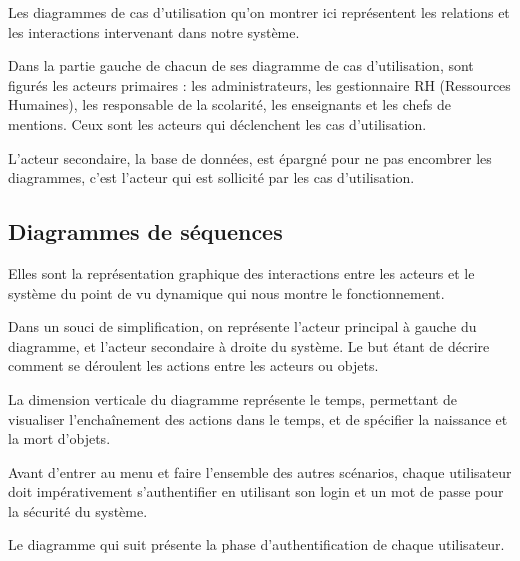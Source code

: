 Les diagrammes de cas d'utilisation qu'on montrer ici représentent les relations et les interactions intervenant dans notre système.
\medskip

Dans la partie gauche de chacun de ses diagramme de cas d'utilisation, sont figurés les acteurs primaires : les administrateurs, les gestionnaire RH (Ressources Humaines), les responsable de la scolarité, les enseignants et les chefs de mentions. Ceux sont les acteurs qui déclenchent les cas d'utilisation. 
\medskip

L'acteur secondaire, la base de données, est épargné pour ne pas encombrer les diagrammes, c'est l'acteur qui est sollicité par les cas d'utilisation.




\clearpage

\subsection{Diagrammes de séquences}
Elles sont la représentation graphique des interactions entre les acteurs et le système du point de vu dynamique qui nous montre le fonctionnement.
\medskip

Dans un souci de simplification, on représente l'acteur principal à gauche du diagramme, et l'acteur secondaire à droite du système. Le but étant de décrire comment se déroulent les actions entre les acteurs ou objets.
\medskip

La dimension verticale du diagramme représente le temps, permettant de visualiser l'enchaînement des actions dans le temps, et de spécifier la naissance et la mort d'objets.
\medskip

Avant d'entrer au menu et faire l'ensemble des autres scénarios, chaque utilisateur doit impérativement s'authentifier en utilisant son login et un mot de passe pour la sécurité du système.
\medskip

Le diagramme qui suit présente la phase d'authentification de chaque utilisateur.

